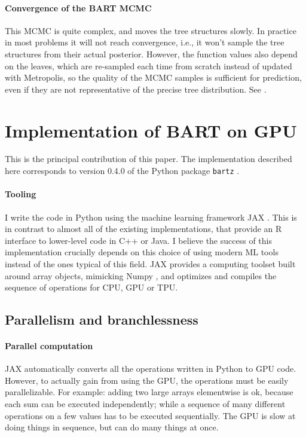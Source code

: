 \documentclass{article}
\begin{document}
    \paragraph{Convergence of the BART MCMC}

    This MCMC is quite complex, and moves the tree structures slowly. In practice in most problems it will not reach convergence, i.e., it won't sample the tree structures from their actual posterior. However, the function values also depend on the leaves, which are re-sampled each time from scratch instead of updated with Metropolis, so the quality of the MCMC samples is sufficient for prediction, even if they are not representative of the precise tree distribution. See \textcites[12]{ronen2022}[4]{tan2024}.

    \section{Implementation of BART on GPU}
    \label{sec:impl}

    This is the principal contribution of this paper. The implementation described here corresponds to version 0.4.0 of the Python package \texttt{bartz} \autocite{petrillo2024b}.

    \paragraph{Tooling}

    I write the code in Python using the machine learning framework JAX \autocite{bradbury2018}. This is in contrast to almost all of the existing implementations, that provide an R interface to lower-level code in C++ or Java. I believe the success of this implementation crucially depends on this choice of using modern ML tools instead of the ones typical of this field. JAX provides a computing toolset built around array objects, mimicking Numpy \autocite{harris2020}, and optimizes and compiles the sequence of operations for CPU, GPU or TPU.

    \subsection{Parallelism and branchlessness}

    \paragraph{Parallel computation}

    JAX automatically converts all the operations written in Python to GPU code. However, to actually gain from using the GPU, the operations must be easily parallelizable. For example: adding two large arrays elementwise is ok, because each sum can be executed independently; while a sequence of many different operations on a few values has to be executed sequentially. The GPU is slow at doing things in sequence, but can do many things at once.
\end{document}
